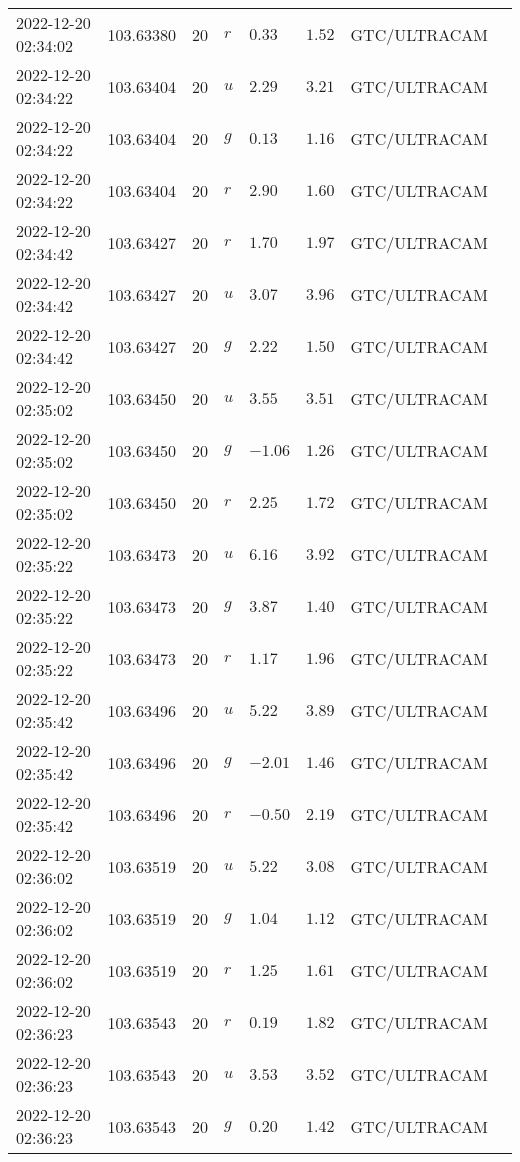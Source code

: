 \documentclass{nature_plusfigure}
\begin{document}
\begin{supplement}
\begin{center}
\begin{longtable}{llllllll}
2022-12-20 02:34:02 & 103.63380 & 20 & $r$ & $0.33$ & $1.52$ & GTC/ULTRACAM &  \\ 
2022-12-20 02:34:22 & 103.63404 & 20 & $u$ & $2.29$ & $3.21$ & GTC/ULTRACAM &  \\ 
2022-12-20 02:34:22 & 103.63404 & 20 & $g$ & $0.13$ & $1.16$ & GTC/ULTRACAM &  \\ 
2022-12-20 02:34:22 & 103.63404 & 20 & $r$ & $2.90$ & $1.60$ & GTC/ULTRACAM &  \\ 
2022-12-20 02:34:42 & 103.63427 & 20 & $r$ & $1.70$ & $1.97$ & GTC/ULTRACAM &  \\ 
2022-12-20 02:34:42 & 103.63427 & 20 & $u$ & $3.07$ & $3.96$ & GTC/ULTRACAM &  \\ 
2022-12-20 02:34:42 & 103.63427 & 20 & $g$ & $2.22$ & $1.50$ & GTC/ULTRACAM &  \\ 
2022-12-20 02:35:02 & 103.63450 & 20 & $u$ & $3.55$ & $3.51$ & GTC/ULTRACAM &  \\ 
2022-12-20 02:35:02 & 103.63450 & 20 & $g$ & $-1.06$ & $1.26$ & GTC/ULTRACAM &  \\ 
2022-12-20 02:35:02 & 103.63450 & 20 & $r$ & $2.25$ & $1.72$ & GTC/ULTRACAM &  \\ 
2022-12-20 02:35:22 & 103.63473 & 20 & $u$ & $6.16$ & $3.92$ & GTC/ULTRACAM &  \\ 
2022-12-20 02:35:22 & 103.63473 & 20 & $g$ & $3.87$ & $1.40$ & GTC/ULTRACAM &  \\ 
2022-12-20 02:35:22 & 103.63473 & 20 & $r$ & $1.17$ & $1.96$ & GTC/ULTRACAM &  \\ 
2022-12-20 02:35:42 & 103.63496 & 20 & $u$ & $5.22$ & $3.89$ & GTC/ULTRACAM &  \\ 
2022-12-20 02:35:42 & 103.63496 & 20 & $g$ & $-2.01$ & $1.46$ & GTC/ULTRACAM &  \\ 
2022-12-20 02:35:42 & 103.63496 & 20 & $r$ & $-0.50$ & $2.19$ & GTC/ULTRACAM &  \\ 
2022-12-20 02:36:02 & 103.63519 & 20 & $u$ & $5.22$ & $3.08$ & GTC/ULTRACAM &  \\ 
2022-12-20 02:36:02 & 103.63519 & 20 & $g$ & $1.04$ & $1.12$ & GTC/ULTRACAM &  \\ 
2022-12-20 02:36:02 & 103.63519 & 20 & $r$ & $1.25$ & $1.61$ & GTC/ULTRACAM &  \\ 
2022-12-20 02:36:23 & 103.63543 & 20 & $r$ & $0.19$ & $1.82$ & GTC/ULTRACAM &  \\ 
2022-12-20 02:36:23 & 103.63543 & 20 & $u$ & $3.53$ & $3.52$ & GTC/ULTRACAM &  \\ 
2022-12-20 02:36:23 & 103.63543 & 20 & $g$ & $0.20$ & $1.42$ & GTC/ULTRACAM &  \\ 

\end{longtable}
\end{center}
\end{supplement}
\end{document}
